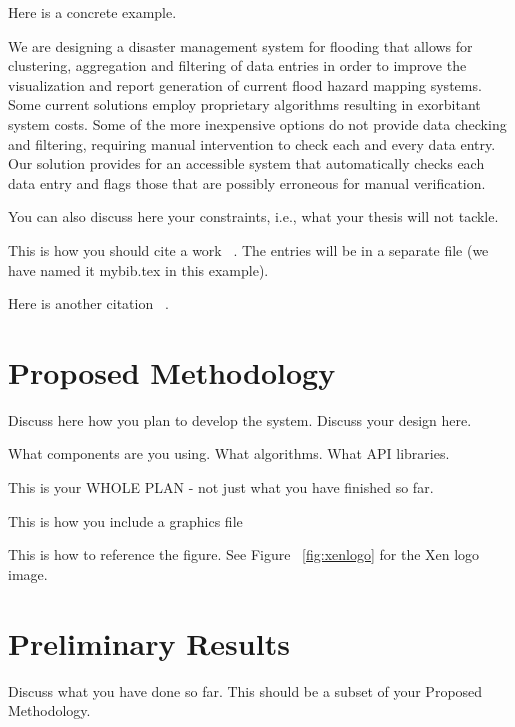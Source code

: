 \documentclass[12pt]{article}
\begin{document}
Here is a concrete example.

We are designing a disaster management system for flooding that allows for clustering, aggregation and filtering of data entries in order to improve the visualization and report generation of current flood hazard mapping systems. Some current solutions employ proprietary algorithms resulting in exorbitant system costs. Some of the more inexpensive options do not provide data checking and filtering, requiring manual intervention to check each and every data entry. Our solution provides for an accessible system that automatically checks each data entry and flags those that are possibly erroneous for manual verification. 

You can also discuss here your constraints, i.e., what your thesis will not tackle.

This is how you should cite a work ~\cite{Nobody06}. The entries will be in a separate file (we have named it mybib.tex in this example). 

Here is another citation ~\cite{Reyes2010}. 


\section{Proposed Methodology}

Discuss here how you plan to develop the system. Discuss your design here.

What components are you using.
What algorithms.
What API libraries.

This is your WHOLE PLAN - not just what you have finished so far.

This is how you include a graphics file 

This is how to reference the figure. See Figure ~\ref{fig:xenlogo} for the Xen logo image. 

\section{Preliminary Results}
Discuss what you have done so far. This should be a subset of your Proposed Methodology.

{}

\end{document}
